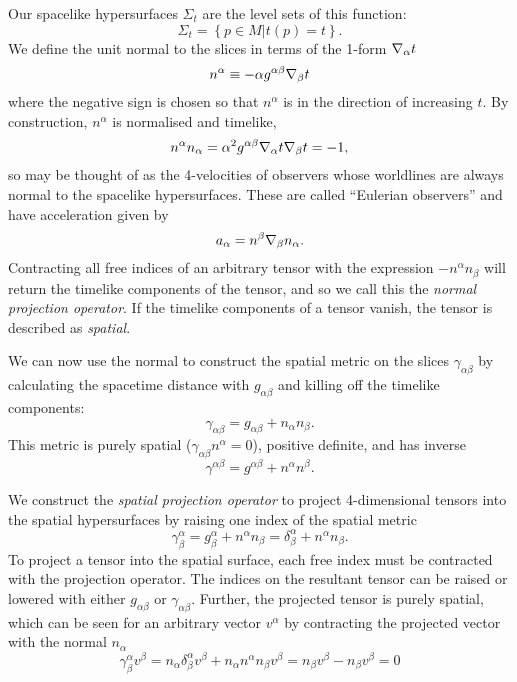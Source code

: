Our spacelike hypersurfaces $\Sigma_t$ are the level sets of this function:
\begin{equation}
\Sigma_{t} = \left\lbrace p \in M | t(p)=t \right\rbrace.
\end{equation}
We define the unit normal to the slices in terms of the 1-form  ${\nabla}_\alpha t$
\begin{equation}
n^\alpha \equiv -\alpha g^{\alpha \beta} {\nabla}_\beta t
\end{equation}
where the negative sign is chosen so that $n^{\alpha}$ is in the direction of increasing $t$. By construction, $n^{\alpha}$ is normalised and timelike,
\begin{equation}
n^{\alpha}n_{\alpha}=\alpha^2 g^{\alpha \beta} {\nabla}_\alpha t {\nabla}_\beta t =-1,
\end{equation}
so may be thought of as the 4-velocities of observers whose worldlines are always normal to the spacelike hypersurfaces. These are called ``Eulerian observers'' and have acceleration given by
\begin{equation}
\label{eq:NormalAcceleration}
a_{\alpha}= n^{\beta} {\nabla}_{\beta} n_{\alpha}.
\end{equation}
Contracting all free indices of an arbitrary tensor with the expression $-n^\alpha n_\beta$ will return the timelike components of the tensor, and so we call this the \textit{normal projection operator}. If the timelike components of a tensor vanish, the tensor is described as \textit{spatial}.

We can now use the normal to construct the spatial metric on the slices $\gamma_{\alpha \beta}$ by calculating the spacetime distance with $g_{\alpha \beta}$ and killing off the timelike components:
\begin{equation}
\label{eq:spatialmetric}
\gamma_{\alpha \beta}=g_{\alpha \beta}+n_\alpha n_\beta.
\end{equation}
This metric is purely spatial ($\gamma_{\alpha \beta} n^{\alpha}=0$), positive definite, and has inverse
\begin{equation}
\label{eq:spatialmetricinverse}
\gamma^{\alpha \beta}=g^{\alpha \beta}+n^\alpha n^\beta.
\end{equation}

We construct the \textit{spatial projection operator} to project 4-dimensional tensors into the spatial hypersurfaces by raising one index of the spatial metric
\begin{equation}
\gamma^\alpha_\beta = g^\alpha_\beta + n^\alpha n_\beta = \delta^\alpha_\beta + n^\alpha n_\beta. 
\end{equation} 
To project a tensor into the spatial surface, each free index must be contracted with the projection operator. The indices on the resultant tensor can be raised or lowered with either $g_{\alpha \beta}$ or $\gamma_{\alpha \beta}$. Further, the projected tensor is purely spatial, which can be seen for an arbitrary vector $v^\alpha$ by contracting the projected vector with the normal $n_\alpha$
\begin{equation}
\gamma^\alpha _\beta v^\beta = n_\alpha \delta^\alpha_\beta v^\beta + n_\alpha n^\alpha n_\beta v^\beta = n_\beta v^\beta - n_\beta v^\beta = 0
\end{equation}

